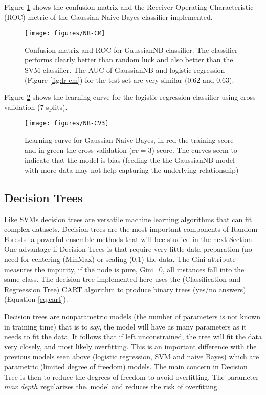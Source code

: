 \documentclass[11pt]{article}
\begin{document}
Figure \ref{fig:nb-cm} shows the confusion matrix and the Receiver Operating Characteristic (ROC) metric of the Gaussian Naive Bayes classifier implemented.
\begin{figure}[H]
        \centering
        \texttt{[image: figures/NB-CM]}
        \caption{Confusion matrix and ROC for GaussianNB classifier. The classifier performs clearly better than random luck and also better than the SVM classifier. The AUC of GaussianNB and logistic regression (Figure \ref{fig:lr-cm}) for the test set  are very similar (0.62 and 0.63).}
\label{fig:nb-cm}
\end{figure}

Figure \ref{fig:nb-cv3} shows the learning curve for the logistic regression classifier using cross-validation (7 splits).
\begin{figure}[H]
        \centering
        \texttt{[image: figures/NB-CV3]}
        \caption{Learning curve for Gaussian Naive Bayes, in red the training score and in green the cross-validation ($cv=3$) score. The curves seem to indicate that the model is bias (feeding the the GaussianNB model with more data may not help capturing the underlying relationship)
        }
\label{fig:nb-cv3}
\end{figure}

\subsection{Decision Trees}
\label{se:resdectree}
Like SVMs decision trees are versatile machine learning algorithms that can fit complex datasets. Decision trees are the most important components of Random Forests -a powerful ensemble methods that will bee studied in the next Section.
One advantage if Decision Trees is that require very little data preparation (no need for centering (MinMax) or scaling (0,1) the data.
The Gini attribute measures the impurity, if the node is pure, Gini=0, all instances fall into the same class.
The decision tree implemented here uses the (Classification and Regreession Tree) CART algorithm to produce binary trees (yes/no answers) (Equation \ref{eq:cart}).
 
Decision trees are nonparametric models (the number of parameters is not known in training time) that is to say, the model will have as many parameters as it needs to fit the data. It follows that if left unconstrained, the tree will fit the data very closely, and most likely overfitting. This is an important difference with the previous models seen above (logistic regression, SVM and naive Bayes) which are parametric (limited degree of freedom) models. 
The main concern in Decision Tree is then to reduce the degrees of freedom to avoid overfitting. The parameter $max\_depth$ regularizes the. model and reduces the risk of overfitting.
\end{document}
